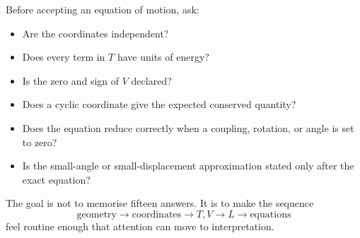 \documentclass[12pt,a4paper]{article}
\begin{document}
Before accepting an equation of motion, ask:

\begin{itemize}
\item Are the coordinates independent?
\item Does every term in $T$ have units of energy?
\item Is the zero and sign of $V$ declared?
\item Does a cyclic coordinate give the expected conserved quantity?
\item Does the equation reduce correctly when a coupling, rotation, or angle is set to zero?
\item Is the small-angle or small-displacement approximation stated only after the exact equation?
\end{itemize}

\begin{resultbox}
The goal is not to memorise fifteen answers. It is to make the sequence
\[
\text{geometry}\to\text{coordinates}\to T,V\to L\to\text{equations}
\]
feel routine enough that attention can move to interpretation.
\end{resultbox}
\end{document}
